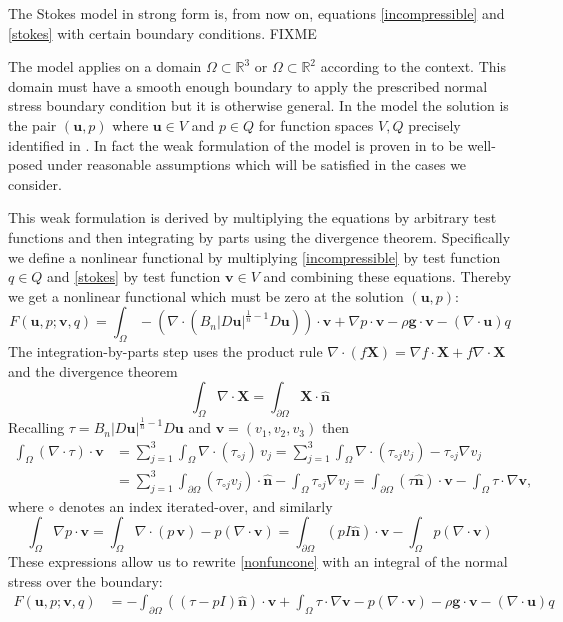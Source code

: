 \documentclass[letterpaper,final,12pt,reqno]{amsart}
\newcommand{\grad}{\nabla}
\newcommand{\RR}{\mathbb{R}}
\newcommand{\hbn}{\hat{\mathbf{n}}}
\newcommand{\bu}{\mathbf{u}}
\newcommand{\bv}{\mathbf{v}}
\newcommand{\bX}{\mathbf{X}}
\begin{document}
The Stokes model in strong form is, from now on, equations \eqref{incompressible} and \eqref{stokes} with certain boundary conditions.  FIXME

The model applies on a domain $\Omega\subset \RR^3$ or $\Omega \subset \RR^2$ according to the context.  This domain must have a smooth enough boundary to apply the prescribed normal stress boundary condition but it is otherwise general.  In the model the solution is the pair $(\bu,p)$ where $\bu\in V$ and $p \in Q$ for function spaces $V,Q$ precisely identified in \cite{JouvetRappaz2011}.  In fact the weak formulation of the model is proven in \cite{JouvetRappaz2011} to be well-posed under reasonable assumptions which will be satisfied in the cases we consider.

This weak formulation is derived by multiplying the equations by arbitrary test functions and then integrating by parts using the divergence theorem.  Specifically we define a nonlinear functional by multiplying \eqref{incompressible} by test function $q\in Q$ and \eqref{stokes} by test function $\bv\in V$ and combining these equations.  Thereby we get a nonlinear functional which must be zero at the solution $(\bu,p)$:
\begin{equation}
F(\bu,p;\bv,q) = \int_\Omega - \left(\nabla \cdot \left(B_n |D\bu|^{\frac{1}{n} - 1} D\bu\right)\right)\cdot \bv + \nabla p \cdot \bv - \rho \mathbf{g} \cdot \bv - \left(\nabla \cdot \bu\right) q \label{nonfuncone}
\end{equation}
The integration-by-parts step uses the product rule $\nabla \cdot(f\bX) = \grad f\cdot \bX + f \nabla \cdot \bX$ and the divergence theorem
    $$\int_\Omega \nabla \cdot \bX = \int_{\partial \Omega} \bX \cdot \hbn$$
Recalling $\tau = B_n |D\bu|^{\frac{1}{n} - 1} D\bu$ and $\bv = (v_1,v_2,v_3)$ then
\begin{align*}
\int_\Omega \left(\nabla \cdot \tau\right)\cdot \bv &= \sum_{j=1}^3 \int_\Omega \nabla \cdot (\tau_{\circ j})\, v_j = \sum_{j=1}^3 \int_\Omega \nabla \cdot (\tau_{\circ j} v_j) - \tau_{\circ j} \nabla v_j \\
  &= \sum_{j=1}^3 \int_{\partial \Omega} (\tau_{\circ j} v_j) \cdot \hbn - \int_\Omega \tau_{\circ j} \nabla v_j = \int_{\partial \Omega} (\tau \hbn)\cdot \bv - \int_\Omega \tau \cdot \nabla \bv,
\end{align*}
where $\circ$ denotes an index iterated-over, and similarly
    $$\int_\Omega \nabla p \cdot \bv = \int_\Omega \nabla\cdot (p\,\bv) - p (\nabla \cdot \bv) = \int_{\partial \Omega} (p I\hbn)\cdot \bv - \int_\Omega p (\nabla \cdot \bv)$$
These expressions allow us to rewrite \eqref{nonfuncone} with an integral of the normal stress over the boundary:
\begin{align}
F(\bu,p;\bv,q) &= -\int_{\partial\Omega} ((\tau-pI) \hbn)\cdot \bv + \int_\Omega \tau \cdot \nabla \bv - p (\nabla \cdot \bv) - \rho \mathbf{g} \cdot \bv - \left(\nabla \cdot \bu\right) q \label{nonfunctwo}
\end{align}
\end{document}
